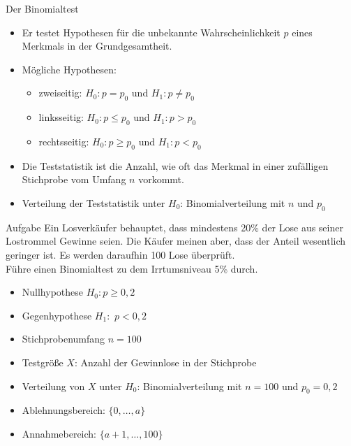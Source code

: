 \documentclass[t,11pt,aspectratio=169]{beamer}
\begin{document}
	
\begin{frame}
\begin{block}{Der Binomialtest}
	\begin{itemize}[<+->]
		\item Er testet Hypothesen für die unbekannte Wahrscheinlichkeit $p$ eines Merkmals in der Grundgesamtheit.
		\item Mögliche Hypothesen:
		\begin{itemize}
			\item zweiseitig: $H_0:p = p_0$ und $H_1:p \neq p_0$
			\item linksseitig: $H_0:p \leq p_0$ und $H_1:p > p_0$
			\item rechtsseitig: $H_0:p \geq p_0$ und $H_1:p < p_0$
		\end{itemize}
		\item Die Teststatistik ist die Anzahl, wie oft das Merkmal in einer zufälligen Stichprobe vom Umfang $n$ vorkommt.
		\item Verteilung der Teststatistik unter $H_0$: Binomialverteilung mit $n$ und $p_0$
	\end{itemize}
\end{block}
\end{frame}

\begin{frame}
\begin{block}{Aufgabe}
	Ein Losverkäufer behauptet, dass mindestens 20\% der Lose aus seiner Lostrommel Gewinne seien. Die Käufer meinen aber, dass der Anteil wesentlich geringer ist. Es werden daraufhin 100 Lose überprüft. \\ Führe einen Binomialtest zu dem Irrtumsniveau 5\% durch.
\end{block}
\pause
\begin{itemize}
	\item Nullhypothese $H_0:p\geq 0,2$
	\item Gegenhypothese $H_1:$ $p < 0,2$
	\item Stichprobenumfang $n=100$
	\item Testgröße $X$: Anzahl der Gewinnlose in der Stichprobe
	\item Verteilung von $X$ unter $H_0$: Binomialverteilung mit $n=100$ und $p_0=0,2$
	\pause
	\item Ablehnungsbereich: $\{0,\dots,a \}$
	\item Annahmebereich: $\{a+1,\dots, 100 \}$
\end{itemize}
\end{frame}
\end{document}
